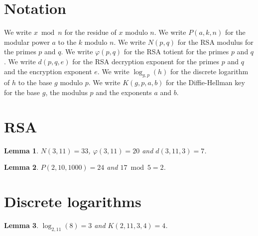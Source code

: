 \documentclass{article}
\newtheorem{lemma}{Lemma}
\begin{document}
\section{Notation}

We write $x\bmod n$ for the residue of $x$ modulo $n$.
We write $P(a,k,n)$ for the modular power $a$ to the $k$ modulo $n$.
We write $N(p,q)$ for the RSA modulus for the primes $p$ and $q$.
We write $\varphi(p,q)$ for the RSA totient for the primes $p$ and $q$.
We write $d(p,q,e)$ for the RSA decryption exponent for the primes $p$ and $q$ and the encryption exponent $e$.
We write $\log_{g,p}(h)$ for the discrete logarithm of $h$ to the base $g$ modulo $p$.
We write $K(g,p,a,b)$ for the Diffie-Hellman key for the base $g$, the modulus $p$ and the exponents $a$ and $b$.

\section{RSA}

\begin{lemma}\label{rsa}
$N(3,11)=33$, $\varphi(3,11)=20$ and $d(3,11,3)=7$.
\end{lemma}

\begin{lemma}\label{power}
$P(2,10,1000)=24$ and $17\bmod 5=2$.
\end{lemma}

\section{Discrete logarithms}

\begin{lemma}\label{dlog}
$\log_{2,11}(8)=3$ and $K(2,11,3,4)=4$.
\end{lemma}
\end{document}
